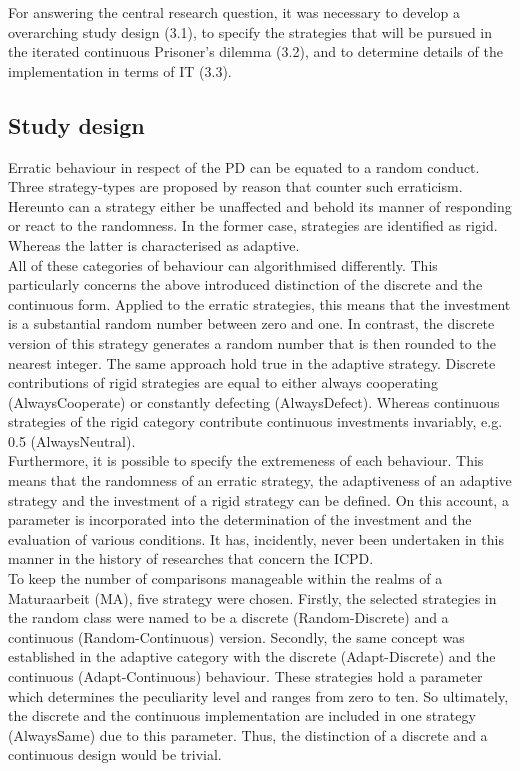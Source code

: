 \documentclass{article}
\begin{document}
For answering the central research question, it was necessary to develop a overarching study design (3.1), to specify the strategies that will be pursued in the iterated continuous Prisoner’s dilemma (3.2), and to determine details of the implementation in terms of IT (3.3).

\subsection{Study design}

Erratic behaviour in respect of the PD can be equated to a random conduct.
Three strategy-types are proposed by reason that counter such erraticism.
Hereunto can a strategy either be unaffected and behold its manner of responding or react to the randomness.
In the former case, strategies are identified as rigid.
Whereas the latter is characterised as adaptive.\\

All of these categories of behaviour can algorithmised differently.
This particularly concerns the above introduced distinction of the discrete and the continuous form.
Applied to the erratic strategies, this means that the investment is a substantial random number between zero and one.
In contrast, the discrete version of this strategy generates a random number that is then rounded to the nearest integer.
The same approach hold true in the adaptive strategy.
Discrete contributions of rigid strategies are equal to either always cooperating (AlwaysCooperate) or constantly defecting (AlwaysDefect).
Whereas continuous strategies of the rigid category contribute continuous investments invariably, e.g. 0.5 (AlwaysNeutral).\\

Furthermore, it is possible to specify the extremeness of each behaviour.
This means that the randomness of an erratic strategy, the adaptiveness of an adaptive strategy and the investment of a rigid strategy can be defined.
On this account, a parameter is incorporated into the determination of the investment and the evaluation of various conditions.
It has, incidently, never been undertaken in this manner in the history of researches that concern the ICPD.\\

To keep the number of comparisons manageable within the realms of a Maturaarbeit (MA), five strategy were chosen.
Firstly, the selected strategies in the random class were named to be a discrete (Random-Discrete) and a continuous (Random-Continuous) version.
Secondly, the same concept was established in the adaptive category with the discrete (Adapt-Discrete) and the continuous (Adapt-Continuous) behaviour.
These strategies hold a parameter which determines the peculiarity level and ranges from zero to ten.
So ultimately, the discrete and the continuous implementation are included in one strategy (AlwaysSame) due to this parameter.
Thus, the distinction of a discrete and a continuous design would be trivial.\\
\end{document}
